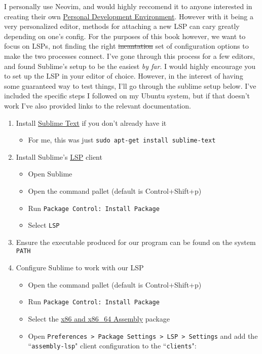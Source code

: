 I personally use Neovim, and would highly reccomend it to anyone interested in creating their own \href{https://www.youtube.com/watch?v=QMVIJhC9Veg}{Personal Development Environment}. However with it being a very personalized editor, methods for attaching a new LSP can cary greatly depending on one's config. For the purposes of this book however, we want to focus on LSPs, not finding the right \st{incantation} set of configuration options to make the two processes connect. I've gone through this process for a few editors, and found Sublime's setup to be the easiest \textit{by far}. I would highly encourage you to set up the LSP in your editor of choice. However, in the interest of having some guaranteed way to test things, I'll go through the sublime setup below. I've included the specific steps I followed on my Ubuntu system, but if that doesn't work I've also provided links to the relevant documentation.

\begin{enumerate}
	\item Install \href{https://www.sublimetext.com/}{Sublime Text} if you don't already have it
	      \begin{itemize}
		      \item For me, this was just \texttt{sudo apt-get install sublime-text}
	      \end{itemize}
      \item Install Sublime's \href{https://github.com/sublimelsp/LSP}{LSP} client
	      \begin{itemize}
		      \item Open Sublime
		      \item Open the command pallet (default is Control+Shift+p)
		      \item Run \texttt{Package Control: Install Package}
		      \item Select \texttt{LSP}
	      \end{itemize}
    \item Ensure the executable produced for our program can be found on the system \texttt{PATH}
	\item Configure Sublime to work with our LSP
	      \begin{itemize}
		      \item Open the command pallet (default is Control+Shift+p)
		      \item Run \texttt{Package Control: Install Package}
		      \item Select the \href{https://packagecontrol.io/packages/x86\%20and\%20x86_64\%20Assembly}{x86 and x86\_64 Assembly} package
		      \item Open \texttt{Preferences > Package Settings > LSP > Settings} and add the ``\texttt{assembly-lsp}" client configuration to the ``\texttt{clients}":
	      \end{itemize}
\end{enumerate}

